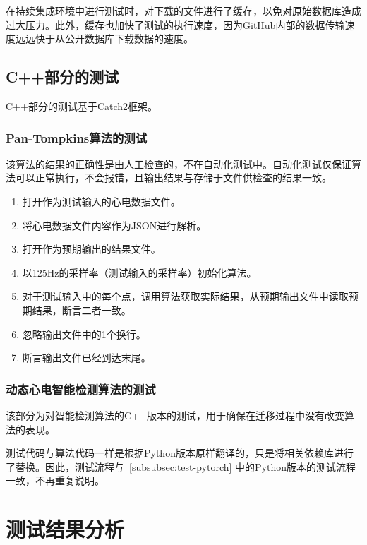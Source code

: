 在持续集成环境中进行测试时，对下载的文件进行了缓存，以免对原始数据库造成过大压力。此外，缓存也加快了测试的执行速度，因为GitHub内部的数据传输速度远远快于从公开数据库下载数据的速度。

\subsection{C++部分的测试}\label{subsec:test-cpp}

C++部分的测试基于Catch2框架。

\subsubsection{Pan-Tompkins算法的测试}

该算法的结果的正确性是由人工检查的，不在自动化测试中。自动化测试仅保证算法可以正常执行，不会报错，且输出结果与存储于文件供检查的结果一致。

\begin{enumerate}
    \item 打开作为测试输入的心电数据文件。
    \item 将心电数据文件内容作为JSON进行解析。
    \item 打开作为预期输出的结果文件。
    \item 以125Hz的采样率（测试输入的采样率）初始化算法。
    \item 对于测试输入中的每个点，调用算法获取实际结果，从预期输出文件中读取预期结果，断言二者一致。
    \item 忽略输出文件中的1个换行。
    \item 断言输出文件已经到达末尾。
\end{enumerate}

\subsubsection{动态心电智能检测算法的测试}

该部分为对智能检测算法的C++版本的测试，用于确保在迁移过程中没有改变算法的表现。

测试代码与算法代码一样是根据Python版本原样翻译的，只是将相关依赖库进行了替换。因此，测试流程与~\ref{subsubsec:test-pytorch} 中的Python版本的测试流程一致，不再重复说明。


\section{测试结果分析}\label{sec:test-result}

